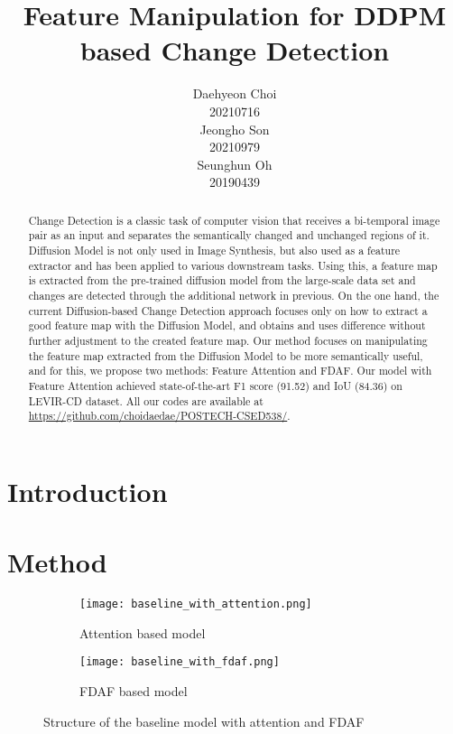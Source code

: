 \documentclass{article}
\title{Feature Manipulation for DDPM based Change Detection}
\author{%
  Daehyeon Choi\\
  20210716\\
  \And
  Jeongho Son\\
  20210979\\
  \And
  Seunghun Oh\\
  20190439\\
}
\begin{document}
\maketitle

\begin{abstract}
  Change Detection is a classic task of computer vision that receives a bi-temporal image pair as an input and separates the semantically changed and unchanged regions of it. Diffusion Model is not only used in Image Synthesis, but also used as a feature extractor and has been applied to various downstream tasks. Using this, a feature map is extracted from the pre-trained diffusion model from the large-scale data set and changes are detected through the additional network in previous. 
  On the one hand, the current Diffusion-based Change Detection approach focuses only on how to extract a good feature map with the Diffusion Model, and obtains and uses difference without further adjustment to the created feature map. Our method focuses on manipulating the feature map extracted from the Diffusion Model to be more semantically useful, and for this, we propose two methods: Feature Attention and FDAF. Our model with Feature Attention achieved state-of-the-art F1 score (91.52) and IoU (84.36) on LEVIR-CD dataset. All our codes are available at \href{https://github.com/choidaedae/POSTECH-CSED538/}{https://github.com/choidaedae/POSTECH-CSED538/}.
\end{abstract}


\section{Introduction}




\section{Method}

\begin{figure}[h]
  \centering
  \begin{subfigure}[b]{0.4\linewidth}
      \texttt{[image: baseline\_with\_attention.png]}
      \caption{Attention based model}
      \label{fig:baseline_with_attention}
  \end{subfigure}
  \hspace{0.1\textwidth}
  \begin{subfigure}[b]{0.4\linewidth}
      \texttt{[image: baseline\_with\_fdaf.png]}
      \caption{FDAF based model}
      \label{fig:baseline_with_fdaf}
  \end{subfigure}
  \caption{Structure of the baseline model with attention and FDAF}
  \label{fig:baseline_with_attention_and_fdaf}
\end{figure}
\end{document}
